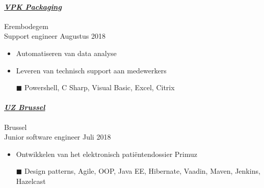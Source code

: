 \documentclass[a4paper, twoside]{article}
\begin{document}
\paragraph{\textbf{\textit{\href{https://vpkgroup.com }{\textcolor{blueDark}{ VPK Packaging }}}}} \hfill\small Erembodegem \\
Support engineer \hfill\small
Augustus 2018
\begin{itemize}
\itemsep-0.2em
\item Automatiseren van data analyse
\item Leveren van technisch support aan medewerkers
\item[\color{orange}$\blacksquare$] Powershell, C Sharp, Visual Basic, Excel, Citrix
\end{itemize}
\paragraph{\textbf{\textit{\href{https://uzbrussel.be }{\textcolor{blueDark}{ UZ Brussel }}}}} \hfill\small Brussel \\
Junior software engineer \hfill\small
Juli 2018
\begin{itemize}
\itemsep-0.2em
\item Ontwikkelen van het elektronisch patiëntendossier Primuz
\item[\color{orange}$\blacksquare$] Design patterns, Agile, OOP, Java EE, Hibernate, Vaadin, Maven, Jenkins, Hazelcast
\end{itemize}
\end{document}
